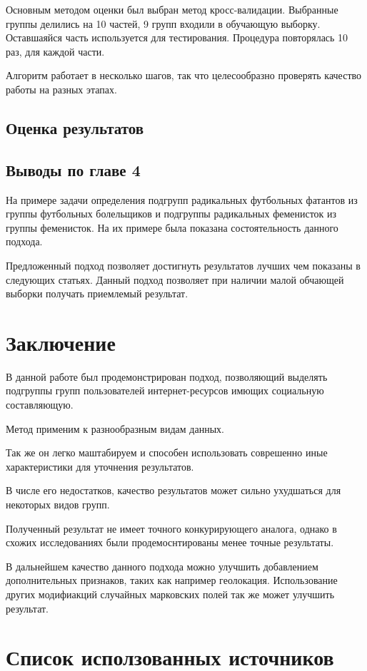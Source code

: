 \documentclass[annotation,times,page4]{itmo-student-thesis}
\begin{document}
Основным методом оценки был выбран метод кросс-валидации. Выбранные группы делились на 10 частей, 9 групп входили в обучающую выборку. Оставшаяйся часть используется для тестирования. Процедура повторялась 10 раз, для каждой части.


Алгоритм работает в несколько шагов, так что целесообразно проверять качество работы на разных этапах.
\section{Оценка результатов}
\section{Выводы по главе 4}
На примере задачи определения подгрупп радикальных футбольных фатантов из группы футбольных болельщиков и подгруппы радикальных феменисток из группы феменисток. На их примере была показана состоятельность данного подхода. 

Предложенный подход позволяет достигнуть результатов лучших чем показаны в следующих статьях. Данный подход позволяет при наличии малой обчающей выборки получать приемлемый результат.

\chapter{Заключение}
В данной работе был продемонстрирован подход, позволяющий выделять подгруппы групп пользователей интернет-ресурсов имющих социальную составляющую.

Метод применим к разнообразным видам данных.

Так же он легко маштабируем и способен использовать соврешенно иные характеристики для уточнения результатов.

В числе его недостатков, качество результатов может сильно ухудшаться для некоторых видов групп.

Полученный результат не имеет точного конкурирующего аналога, однако в схожих исследованиях были продемоснтированы менее точные результаты.

В дальнейшем качество данного подхода можно улучшить добавлением дополнительных признаков, таких как например геолокация. Использование других модифиакций случайных марковских полей так же может улучшить результат.

\chapter{Список исползованных источников}
\end{document}
